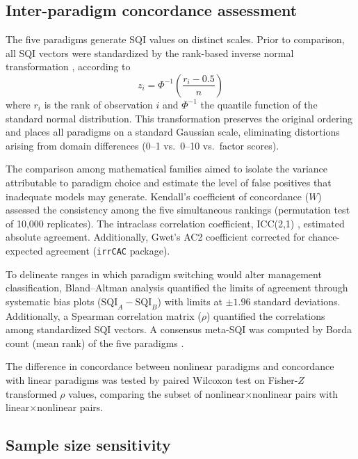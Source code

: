 \documentclass[pdflatex,sn-basic]{sn-jnl}%
\begin{document}
\subsection{Inter-paradigm concordance assessment}\label{subsec:concordance}

The five paradigms generate SQI values on distinct scales. Prior to comparison, all SQI vectors were standardized by the rank-based inverse normal transformation \citep{Blom1958}, according to
\begin{equation}
z_i = \Phi^{-1}\!\left(\frac{r_i - 0.5}{n}\right)
\label{eq:blom}
\end{equation}
where $r_i$ is the rank of observation $i$ and $\Phi^{-1}$ the quantile function of the standard normal distribution. This transformation preserves the original ordering and places all paradigms on a standard Gaussian scale, eliminating distortions arising from domain differences (0--1 vs.\ 0--10 vs.\ factor scores).

The comparison among mathematical families aimed to isolate the variance attributable to paradigm choice and estimate the level of false positives that inadequate models may generate. Kendall's coefficient of concordance ($W$) assessed the consistency among the five simultaneous rankings (permutation test of 10,000 replicates). The intraclass correlation coefficient, ICC(2,1) \citep{ShroutFleiss1979}, estimated absolute agreement. Additionally, Gwet's AC2 coefficient \citep{Gwet2008} corrected for chance-expected agreement (\texttt{irrCAC} package).

To delineate ranges in which paradigm switching would alter management classification, Bland--Altman analysis \citep{BlandAltman1986} quantified the limits of agreement through systematic bias plots ($\text{SQI}_A - \text{SQI}_B$) with limits at $\pm 1.96$ standard deviations. Additionally, a Spearman correlation matrix ($\rho$) quantified the correlations among standardized SQI vectors. A consensus meta-SQI was computed by Borda count (mean rank) of the five paradigms \citep{Lin2010}.

The difference in concordance between nonlinear paradigms and concordance with linear paradigms was tested by paired Wilcoxon test on Fisher-$Z$ transformed $\rho$ values, comparing the subset of nonlinear$\times$nonlinear pairs with linear$\times$nonlinear pairs.

\subsection{Sample size sensitivity}\label{subsec:sensitivity}
\end{document}
